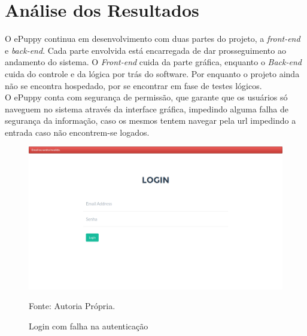 \chapter{Análise dos Resultados}
O ePuppy continua em desenvolvimento com duas partes do projeto, a {\it front-end} e {\it back-end}. Cada parte envolvida está encarregada de dar prosseguimento ao andamento do sistema. O {\it Front-end} cuida da parte gráfica, enquanto o {\it Back-end} cuida do controle e da lógica por trás do software. Por enquanto o projeto ainda não se encontra hospedado, por se encontrar em fase de testes lógicos.
\\
\indent
O ePuppy conta com segurança de permissão, que garante que os usuários só naveguem no sistema através da interface gráfica, impedindo alguma falha de segurança da informação, caso os mesmos tentem navegar pela url impedindo a entrada caso não encontrem-se logados.

\begin{figure}[h!]
	\center	\includegraphics[scale=0.33
	]{imagens/errologin}
	\caption{Login com falha na autenticação}
	Fonte: Autoria Própria.
	\label{Rotulo}
\end{figure}

